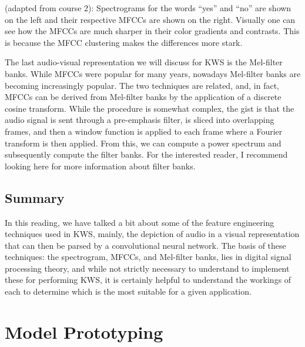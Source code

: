 {  

    (adapted from course 2): Spectrograms for the words “yes” and “no” are shown on the left and their respective MFCCs are shown on the right. Visually one can see how the MFCCs are much sharper in their color gradients and contrasts. This is because the MFCC clustering makes the differences more stark.
    
    The last audio-visual representation we will discuss for KWS is the Mel-filter banks. While MFCCs were popular for many years, nowadays Mel-filter banks are becoming increasingly popular. The two techniques are related, and, in fact, MFCCs can be derived from Mel-filter banks by the application of a discrete cosine transform. While the procedure is somewhat complex, the gist is that the audio signal is sent through a pre-emphasis filter, is sliced into overlapping frames, and then a window function is applied to each frame where a Fourier transform is then applied. From this, we can compute a power spectrum and subsequently compute the filter banks. For the interested reader, I recommend looking here for more information about filter banks.
    
\subsection{Summary}

    In this reading, we have talked a bit about some of the feature engineering techniques used in KWS, mainly, the depiction of audio in a visual representation that can then be parsed by a convolutional neural network. The basis of these techniques: the spectrogram, MFCCs, and Mel-filter banks, lies in digital signal processing theory, and while not strictly necessary to understand to implement these for performing KWS, it is certainly helpful to understand the workings of each to determine which is the most suitable for a given application.   
 
 
\section{Model Prototyping}

}
